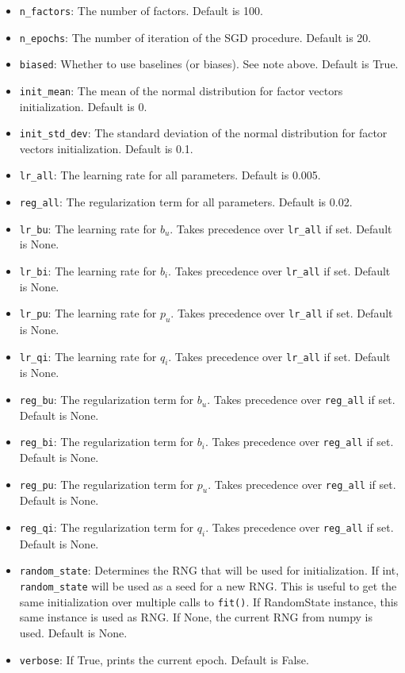 \documentclass{article}
\begin{document}
\begin{itemize}
    \item \texttt{n\_factors}: The number of factors. Default is 100.
    \item \texttt{n\_epochs}: The number of iteration of the SGD procedure. Default is 20.
    \item \texttt{biased}: Whether to use baselines (or biases). See note above. Default is True.
    \item \texttt{init\_mean}: The mean of the normal distribution for factor vectors initialization. Default is 0.
    \item \texttt{init\_std\_dev}: The standard deviation of the normal distribution for factor vectors initialization. Default is 0.1.
    \item \texttt{lr\_all}: The learning rate for all parameters. Default is 0.005.
    \item \texttt{reg\_all}: The regularization term for all parameters. Default is 0.02.
    \item \texttt{lr\_bu}: The learning rate for $b_u$. Takes precedence over \texttt{lr\_all} if set. Default is None.
    \item \texttt{lr\_bi}: The learning rate for $b_i$. Takes precedence over \texttt{lr\_all} if set. Default is None.
    \item \texttt{lr\_pu}: The learning rate for $p_u$. Takes precedence over \texttt{lr\_all} if set. Default is None.
    \item \texttt{lr\_qi}: The learning rate for $q_i$. Takes precedence over \texttt{lr\_all} if set. Default is None.
    \item \texttt{reg\_bu}: The regularization term for $b_u$. Takes precedence over \texttt{reg\_all} if set. Default is None.
    \item \texttt{reg\_bi}: The regularization term for $b_i$. Takes precedence over \texttt{reg\_all} if set. Default is None.
    \item \texttt{reg\_pu}: The regularization term for $p_u$. Takes precedence over \texttt{reg\_all} if set. Default is None.
    \item \texttt{reg\_qi}: The regularization term for $q_i$. Takes precedence over \texttt{reg\_all} if set. Default is None.
    \item \texttt{random\_state}: Determines the RNG that will be used for initialization. If int, \texttt{random\_state} will be used as a seed for a new RNG. This is useful to get the same initialization over multiple calls to \texttt{fit()}. If RandomState instance, this same instance is used as RNG. If None, the current RNG from numpy is used. Default is None.
    \item \texttt{verbose}: If True, prints the current epoch. Default is False.
\end{itemize}
\end{document}
